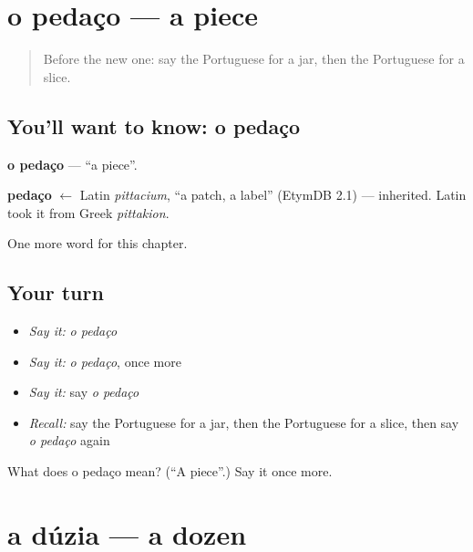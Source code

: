 \section[o pedaço]{o pedaço — a piece}

\label{lesson:PT-C228-pedaco}



\begin{quote}
Before the new one: say the Portuguese for a jar, then the Portuguese for a slice.
\end{quote}

\subsection*{You'll want to know: o pedaço}
\textbf{o pedaço} — \textquotedblleft{}a piece\textquotedblright{}.

\begin{cousinweb}
\textbf{pedaço} $\leftarrow$ Latin \emph{pittacium}, \textquotedblleft{}a patch, a label\textquotedblright{} (EtymDB 2.1) — inherited. Latin took it from Greek \emph{pittakion}.
\end{cousinweb}

\begin{grammarlens}[title={What you've built}]
One more word for this chapter.
\end{grammarlens}

\subsection*{Your turn}
\begin{itemize}
\raggedright
  \item \emph{Say it:} \emph{o pedaço}
  \item \emph{Say it:} \emph{o pedaço}, once more
  \item \emph{Say it:} say \emph{o pedaço}
  \item \emph{Recall:} say the Portuguese for a jar, then the Portuguese for a slice, then say \emph{o pedaço} again
\end{itemize}

\begin{tcolorbox}[breakable,colback=teal!4,colframe=teal!35!black,title={Before you move on}]
What does o pedaço mean? (\textquotedblleft{}A piece\textquotedblright{}.) Say it once more.
\end{tcolorbox}
\section[a dúzia]{a dúzia — a dozen}

